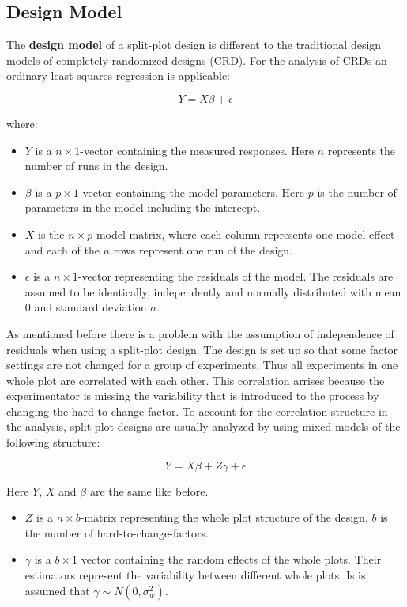\subsection{Design Model}

The \textbf{design model} of a split-plot design is different to the traditional design models of completely randomized designs (CRD). For the analysis of CRDs an ordinary least squares regression is applicable:

$$Y = X \beta + \epsilon$$

where:

\begin{itemize}
	\item $Y$ is a $n \times 1$-vector containing the measured responses. Here $n$ represents the number of runs in the design.
	\item $\beta$ is a $p\times 1$-vector containing the model parameters. Here $p$ is the number of parameters in the model including the intercept.
	\item $X$ is the $n \times p$-model matrix, where each column represents one model effect and each of the $n$ rows represent one run of the design.
	\item $\epsilon$ is a $n \times 1$-vector representing the residuals of the model. The residuals are assumed to be identically, independently and normally distributed with mean 0 and standard deviation $\sigma$.
\end{itemize}

As mentioned before there is a problem with the assumption of independence of residuals when using a split-plot design. The design is set up so that some factor settings are not changed for a group of experiments. Thus all experiments in one whole plot are correlated with each other. This correlation arrises because the experimentator is missing the variability that is introduced to the process by changing the hard-to-change-factor. To account for the correlation structure in the analysis, split-plot designs are usually analyzed by using mixed models of the following structure:

$$ Y = X\beta + Z\gamma + \epsilon$$

Here $Y$, $X$ and $\beta$ are the same like before.

\begin{itemize}
	\item$Z$ is a $n \times b$-matrix representing the whole plot structure of the design. $b$ is the number of hard-to-change-factors.
	\item $\gamma$ is a $b \times 1$ vector containing the random effects of the whole plots. Their estimators represent the variability between different whole plots. Is is assumed that $\gamma  \sim N(0, \sigma_w^2 )$.
\end{itemize}

